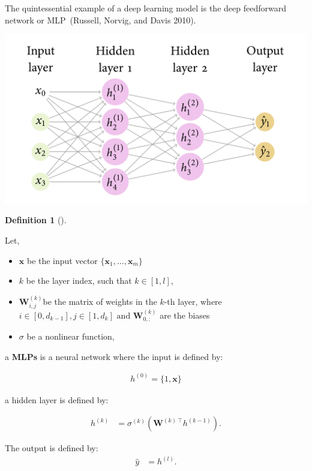 \documentclass[
  letterpaper,
  12pt,
  british]{tufte-book}
\theoremstyle{plain}
\theoremstyle{plain}
\theoremstyle{definition}
\newtheorem{definition}{Definition}[chapter]
\theoremstyle{remark}
\begin{document}
The quintessential example of a deep learning model is the deep
feedforward network or {MLP}~(Russell, Norvig, and Davis
2010).

\includegraphics{Images/neuralnetwork-1.png}

\leavevmode{}%
\begin{definition}[]\label{def-MLP}

Let,

\begin{itemize}
\item
  \({\mathbf{x}}\) be the input vector
  \(\{\mathbf{x}_1, \ldots, \mathbf{x}_m\}\)
\item
  \(k\) be the layer index, such that \(k \in [1,l]\),
\item
  \(\mathbf{W}^{(k)}_{i,j}\)be the matrix of weights in the \(k\)-th
  layer, where
  \(i \in [0,d_{k-1}], j \in [1, d_k] \text{ and }\mathbf{W}^{(k)}_{0,:}\)
  are the biases
\item
  \(\sigma\) be a nonlinear function,
\end{itemize}

a \textbf{{MLPs}} is a neural network where the input is defined by:

\[
 \begin{aligned}          
    h^{(0)}= \{1, \mathbf{x}\}
 \end{aligned}
 \]

a hidden layer is defined by:

\[
 \begin{aligned}          
        h^{(k)}&=\sigma^{(k)}(\mathbf{W}^{(k)~\top} h^{(k-1)}).
 \end{aligned}
 \]

The output is defined by: \[
 \begin{aligned}          
  \hat{y}&=h^{(l)}.
 \end{aligned}
 \]

\end{definition}
\end{document}
